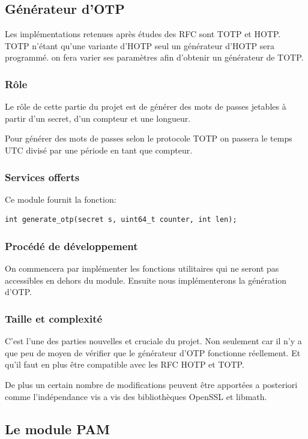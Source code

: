 \documentclass{"../../res/univ-projet"}
\begin{document}
\subsection{Générateur d'OTP}
Les implémentations retenues après études des RFC sont TOTP et HOTP. TOTP
n'étant qu'une variante d'HOTP seul un générateur d'HOTP sera programmé.
on fera varier ses paramètres afin d'obtenir un générateur de TOTP.

\subsubsection{Rôle}
Le rôle de cette partie du projet est de générer des mots de passes jetables
à partir d'un secret, d'un compteur et une longueur. 

Pour générer des mots de passes selon le protocole TOTP on passera le temps UTC
divisé par une période en tant que compteur.

\subsubsection{Services offerts}
Ce module fournit la fonction:
\begin{lstlisting}
int generate_otp(secret s, uint64_t counter, int len);
\end{lstlisting}


\subsubsection{Procédé de développement}
On commencera par implémenter les fonctions utilitaires qui ne seront pas accessibles en
dehors du module. Ensuite nous implémenterons la génération d'OTP.

\subsubsection{Taille et complexité}
C'est l'une des parties nouvelles et cruciale du projet. Non seulement car il n'y 
a que peu de moyen de vérifier que le générateur d'OTP fonctionne réellement. Et
qu'il faut en plus être compatible avec les RFC HOTP et TOTP.

De plus un certain nombre de modifications peuvent être apportées a posteriori comme 
l'indépendance vis a vis des bibliothèques OpenSSL et libmath.

\subsection{Le module PAM}
\end{document}
